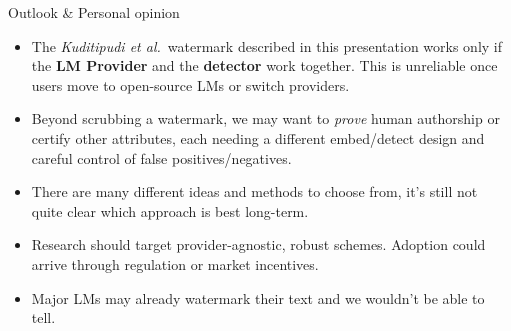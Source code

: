 \begin{frame}{Outlook \& Personal opinion}
    \begin{itemize}
        \item The \emph{Kuditipudi et al.}\ watermark described in this presentation works only if the \textbf{LM Provider} and the \textbf{detector} work together. This is unreliable once users move to open-source LMs or switch providers.
        \item Beyond scrubbing a watermark, we may want to \emph{prove} human authorship or certify other attributes, each needing a different embed/detect design and careful control of false positives/negatives.
        \item There are many different ideas and methods to choose from, it's still not quite clear which approach is best long-term.
        \item Research should target provider-agnostic, robust schemes. Adoption could arrive through regulation or market incentives.
        \item Major LMs may already watermark their text and we wouldn't be able to tell.
    \end{itemize}
\end{frame}
